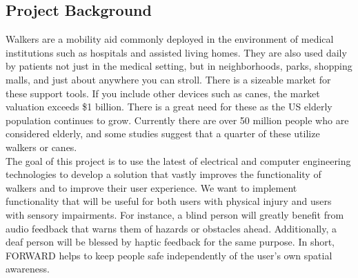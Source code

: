 \subsection*{Project Background}
\noindent Walkers are a mobility aid commonly deployed in the environment of medical institutions such as hospitals and assisted living homes. They are also used daily by patients not just in the medical setting, but in neighborhoods, parks, shopping malls, and just about anywhere you can stroll. There is a sizeable market for these support tools. If you include other devices such as canes, the market valuation exceeds \$1 billion. There is a great need for these as the US elderly population continues to grow. Currently there are over 50 million people who are considered elderly, and some studies suggest that a quarter of these utilize walkers or canes. \\

\noindent The goal of this project is to use the latest of electrical and computer engineering technologies to develop a solution that vastly improves the functionality of walkers and to improve their user experience. We want to implement functionality that will be useful for both users with physical injury and users with sensory impairments. For instance, a blind person will greatly benefit from audio feedback that warns them of hazards or obstacles ahead. Additionally, a deaf person will be blessed by haptic feedback for the same purpose. In short, FORWARD helps to keep people safe independently of the user’s own spatial awareness.
